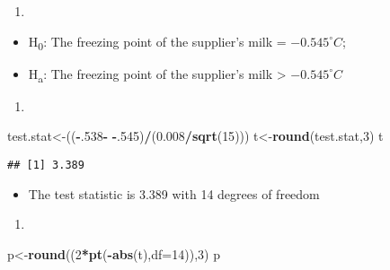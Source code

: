\documentclass[]{article}
\newenvironment{Shaded}{\begin{snugshade}}{\end{snugshade}}
\newcommand{\KeywordTok}[1]{\textcolor[rgb]{0.13,0.29,0.53}{\textbf{#1}}}
\newcommand{\DataTypeTok}[1]{\textcolor[rgb]{0.13,0.29,0.53}{#1}}
\newcommand{\DecValTok}[1]{\textcolor[rgb]{0.00,0.00,0.81}{#1}}
\newcommand{\FloatTok}[1]{\textcolor[rgb]{0.00,0.00,0.81}{#1}}
\newcommand{\StringTok}[1]{\textcolor[rgb]{0.31,0.60,0.02}{#1}}
\newcommand{\OperatorTok}[1]{\textcolor[rgb]{0.81,0.36,0.00}{\textbf{#1}}}
\newcommand{\NormalTok}[1]{#1}
\providecommand{\tightlist}{%
  \setlength{\itemsep}{0pt}\setlength{\parskip}{0pt}}
\begin{document}
\begin{enumerate}
\def\labelenumi{(\alph{enumi})}
\item
\end{enumerate}

\begin{itemize}
\tightlist
\item
  H\textsubscript{0}: The freezing point of the supplier's milk =
  \(-0.545^{\circ}C\);
\item
  H\textsubscript{a}: The freezing point of the supplier's milk
  \textgreater{} \(-0.545^{\circ}C\)
\end{itemize}

\begin{enumerate}
\def\labelenumi{(\alph{enumi})}
\setcounter{enumi}{1}
\item
\end{enumerate}

\begin{Shaded}
\begin{Highlighting}[]
\NormalTok{test.stat<-((}\OperatorTok{-}\NormalTok{.}\DecValTok{538}\OperatorTok{-}\StringTok{ }\OperatorTok{-}\NormalTok{.}\DecValTok{545}\NormalTok{)}\OperatorTok{/}\NormalTok{(}\FloatTok{0.008}\OperatorTok{/}\KeywordTok{sqrt}\NormalTok{(}\DecValTok{15}\NormalTok{)))}
\NormalTok{t<-}\KeywordTok{round}\NormalTok{(test.stat,}\DecValTok{3}\NormalTok{)}
\NormalTok{t}
\end{Highlighting}
\end{Shaded}

\begin{verbatim}
## [1] 3.389
\end{verbatim}

\begin{itemize}
\tightlist
\item
  The test statistic is 3.389 with 14 degrees of freedom
\end{itemize}

\begin{enumerate}
\def\labelenumi{(\alph{enumi})}
\setcounter{enumi}{2}
\item
\end{enumerate}

\begin{Shaded}
\begin{Highlighting}[]
\NormalTok{p<-}\KeywordTok{round}\NormalTok{((}\DecValTok{2}\OperatorTok{*}\KeywordTok{pt}\NormalTok{(}\OperatorTok{-}\KeywordTok{abs}\NormalTok{(t),}\DataTypeTok{df=}\DecValTok{14}\NormalTok{)),}\DecValTok{3}\NormalTok{)}
\NormalTok{p}
\end{Highlighting}
\end{Shaded}
\end{document}
